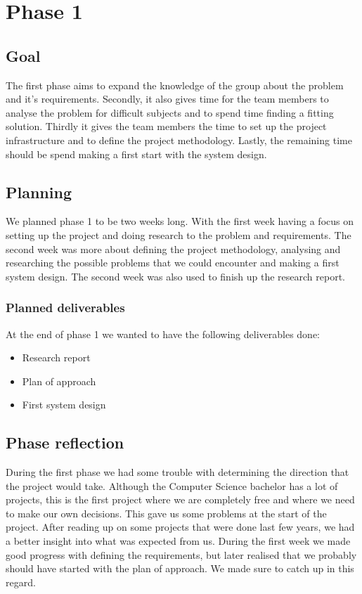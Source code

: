 \section{Phase 1}
\subsection{Goal}
The first phase aims to expand the knowledge of the group about the problem and it's requirements.
Secondly, it also gives time for the team members to analyse the problem for difficult subjects and to spend time finding a fitting solution.
Thirdly it gives the team members the time to set up the project infrastructure and to define the project methodology.
Lastly, the remaining time should be spend making a first start with the system design.

\subsection{Planning}
We planned phase 1 to be two weeks long.
With the first week having a focus on setting up the project and doing research to the problem and requirements.
The second week was more about defining the project methodology, analysing and researching the possible problems that we could encounter and making a first system design.
The second week was also used to finish up the research report.

\subsubsection{Planned deliverables}
At the end of phase 1 we wanted to have the following deliverables done:
\begin{itemize}
\item Research report
\item Plan of approach
\item First system design
\end{itemize}

\subsection{Phase reflection}
During the first phase we had some trouble with determining the direction that the project would take.
Although the Computer Science bachelor has a lot of projects, this is the first project where we are completely free and where we need to make our own decisions. 
This gave us some problems at the start of the project.
After reading up on some projects that were done last few years, we had a better insight into what was expected from us.
During the first week we made good progress with defining the requirements, but later realised that we probably should have started with the plan of approach.
We made sure to catch up in this regard.

